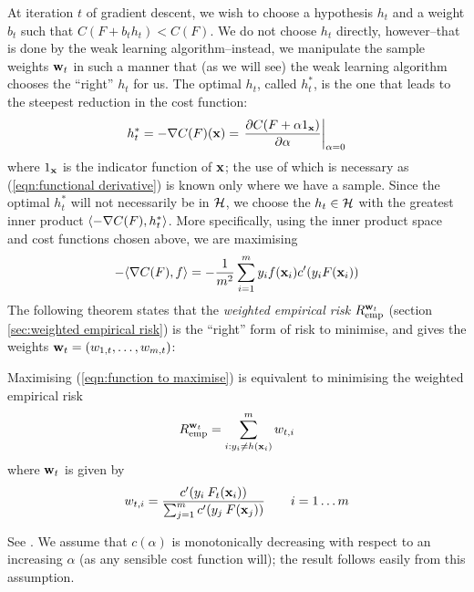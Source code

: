 At iteration $t$ of gradient descent, we wish to choose a hypothesis $h_t$ and
a weight $b_t$ such that $C(F + b_t h_t) < C(F)$.  We do not choose
$h_t$ directly, however--that is done by the weak learning
algorithm--instead, we manipulate the sample weights $\mathbf{w}_t$ in such
a manner that (as we will see) the weak learning algorithm chooses the
``right'' $h_t$ for us.  The optimal $h_t$, called $h_t^{\ast}$, is
the one that leads to the steepest reduction in the cost function:
%
\begin{equation}
h_t^{\ast} = -\nabla C(F)(\mathbf{x}) = \left. \frac{\partial C(F + \alpha
1_{\mathbf{x}})}{\partial \alpha} \right|_{\alpha = 0}
\label{eqn:functional derivative}
\end{equation}
%
where $1_{\mathbf{x}}$ is the indicator function of $\mathbf{x}$; the use of which
is necessary as (\ref{eqn:functional derivative}) is known only where
we have a sample.  Since the optimal $h_t^{\ast}$ will not necessarily
be in $\mathcal{H}$, we choose the $h_t \in \mathcal{H}$ with the greatest inner
product $\langle {-\nabla C(F)} , {h_t^{\ast}} \rangle$.  More specifically, using the
inner product space and cost functions chosen above, we are maximising 
%
\begin{equation}
- \langle {\nabla C(F)} , {f} \rangle = - \frac{1}{m^2} \sum_{i=1}^{m} y_i f(\mathbf{x}_i)
  c'(y_i F(\mathbf{x}_i))
\label{eqn:function to maximise}
\end{equation}
%
The following theorem states that the \emph{weighted empirical risk}
$R_{\mathrm{emp}}^{\mathbf{w}_t}$ (section \ref{sec:weighted empirical risk}) is
the ``right'' form of risk to minimise, and gives the weights
$\mathbf{w}_t = (w_{1,t}, \ldots, w_{m,t})$:

\begin{theorem}
\label{thm:gradient descent weights and direction}
Maximising (\ref{eqn:function to maximise}) is equivalent to
minimising the weighted empirical risk
%
\begin{equation}
R_{\mathrm{emp}}^{\mathbf{w}_t} = \sum_{i:y_i \neq h(\mathbf{x}_i)}^{m} w_{t,i}
\end{equation}
%
where $\mathbf{w}_{t}$ is given by
%
\begin{equation}
w_{t,i} = \frac{c'(y_i \: F_t (\mathbf{x}_i))}{\sum_{j=1}^{m} c'(y_j \:
F(\mathbf{x}_j))} \qquad i=1 \ldots m
\label{eqn:gradient sample weights}
\end{equation}
\end{theorem}
\proof See \cite{Mason99}.  We assume that $c(\alpha)$ is
monotonically decreasing with respect to an increasing $\alpha$ (as
any sensible cost function will); the result follows easily from this
assumption.

